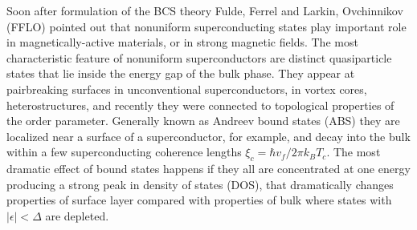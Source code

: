 \documentclass[prb,aps,showpacs,amsmath,twocolumn,10pt]{revtex4-1}
\begin{document}
Soon after formulation of the BCS theory\cite{BCS}
Fulde, Ferrel\cite{PhysRev.135.A550} and Larkin, Ovchinnikov\cite{larkin1965inhomogeneous} (FFLO)
pointed out that nonuniform superconducting states play important role in magnetically-active materials, or 
in strong magnetic fields. 
The most characteristic feature of nonuniform superconductors are distinct quasiparticle states 
that lie inside the energy gap of the bulk phase. 
They appear at pairbreaking surfaces in unconventional superconductors,\cite{CHu1994} 
in vortex cores,\cite{CAROLI1964307} 
heterostructures,\cite{MEschrig2015}
and recently they were connected to topological properties of the order parameter.\cite{Tanaka2012,Mizushima2016}
Generally known as Andreev bound states (ABS) they are localized near 
a surface of a superconductor, for example, and decay into the bulk 
within a few superconducting coherence lengths $\xi_{c} = \hbar v_f/2\pi k_B T_c$.
The most dramatic effect of bound states happens if they all are concentrated at one energy 
producing a strong peak in density of states (DOS), that dramatically changes properties of surface 
layer compared with properties of bulk where states with $|\epsilon|<\Delta$ are depleted. 

\end{document}
